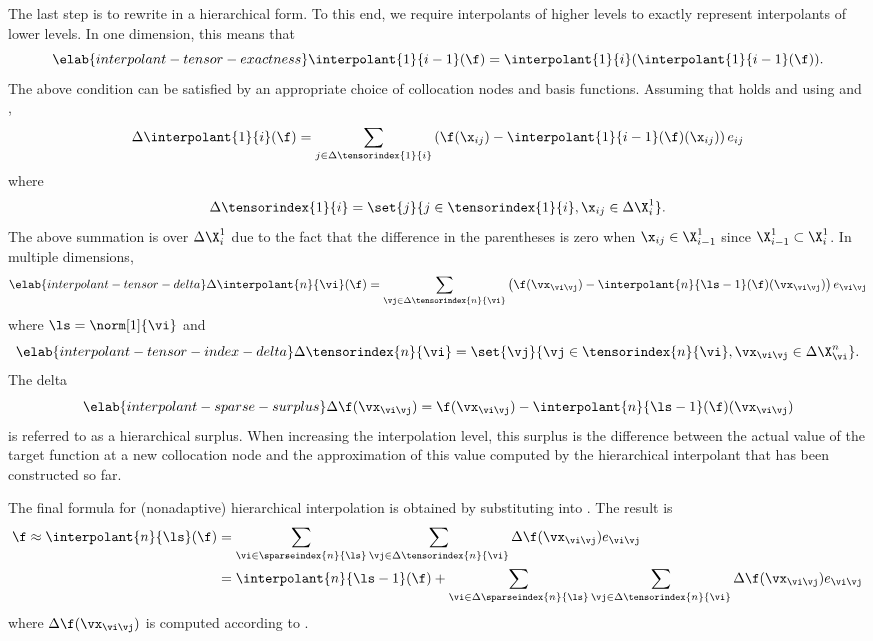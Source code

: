 The last step is to rewrite  in a
hierarchical form. To this end, we require interpolants of higher levels to
exactly represent interpolants of lower levels. In one dimension, this means
that
\begin{equation} \elab{interpolant-tensor-exactness}
  \interpolant{1}{i - 1}(\f) = \interpolant{1}{i}(\interpolant{1}{i - 1}(\f)).
\end{equation}
The above condition can be satisfied by an appropriate choice of collocation
nodes and basis functions. Assuming that 
holds and using  and ,
\[
  \Delta\interpolant{1}{i}(\f) = \sum_{j \in \Delta\tensorindex{1}{i}} \left(\f(\x_{ij}) - \interpolant{1}{i - 1}(\f)(\x_{ij})\right) e_{ij}
\]
where
\[
  \Delta\tensorindex{1}{i} = \set{j}{j \in \tensorindex{1}{i}, \x_{ij} \in \Delta\X^1_i}.
\]
The above summation is over $\Delta\X^1_i$ due to the fact that the difference
in the parentheses is zero when $\x_{ij} \in \X^1_{i - 1}$ since $\X^1_{i - 1}
\subset \X^1_i$. In multiple dimensions,
\begin{equation} \elab{interpolant-tensor-delta}
  \Delta\interpolant{n}{\vi}(\f) = \sum_{\vj \in \Delta\tensorindex{n}{\vi}} \left(\f(\vx_{\vi \vj}) - \interpolant{n}{\ls - 1}(\f)(\vx_{\vi \vj})\right) e_{\vi \vj}
\end{equation}
where $\ls = \norm[1]{\vi}$ and
\begin{equation} \elab{interpolant-tensor-index-delta}
  \Delta\tensorindex{n}{\vi} = \set{\vj}{\vj \in \tensorindex{n}{\vi}, \vx_{\vi \vj} \in \Delta\X^n_{\vi}}.
\end{equation}
The delta
\begin{equation} \elab{interpolant-sparse-surplus}
  \Delta\f(\vx_{\vi \vj}) = \f(\vx_{\vi \vj}) - \interpolant{n}{\ls - 1}(\f)(\vx_{\vi \vj})
\end{equation}
is referred to as a hierarchical surplus. When increasing the interpolation
level, this surplus is the difference between the actual value of the target
function at a new collocation node and the approximation of this value computed
by the hierarchical interpolant that has been constructed so far.

The final formula for (nonadaptive) hierarchical interpolation is obtained by
substituting  into
. The result is
\begin{align*}
  \f \approx \interpolant{n}{\ls}(\f)
  &= \sum_{\vi \in \sparseindex{n}{\ls}} \sum_{\vj \in \Delta\tensorindex{n}{\vi}} \Delta\f(\vx_{\vi \vj}) e_{\vi \vj} \\
  &= \interpolant{n}{\ls - 1}(\f) + \sum_{\vi \in \Delta\sparseindex{n}{\ls}} \sum_{\vj \in \Delta\tensorindex{n}{\vi}} \Delta\f(\vx_{\vi \vj}) e_{\vi \vj}
\end{align*}
where $\Delta\f(\vx_{\vi \vj})$ is computed according to
.
